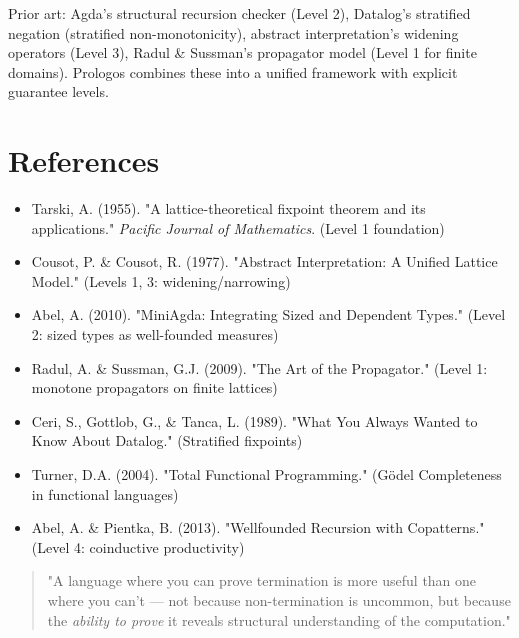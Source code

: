 \documentclass[11pt]{article}
\begin{document}
Prior art: Agda's structural recursion checker (Level 2), Datalog's
stratified negation (stratified non-monotonicity), abstract
interpretation's widening operators (Level 3), Radul \& Sussman's
propagator model (Level 1 for finite domains). Prologos combines
these into a unified framework with explicit guarantee levels.
\section{References}
\label{sec:org59c6d89}

\begin{itemize}
\item Tarski, A. (1955). "A lattice-theoretical fixpoint theorem and its
applications." \emph{Pacific Journal of Mathematics}. (Level 1 foundation)
\item Cousot, P. \& Cousot, R. (1977). "Abstract Interpretation: A Unified
Lattice Model." (Levels 1, 3: widening/narrowing)
\item Abel, A. (2010). "MiniAgda: Integrating Sized and Dependent Types."
(Level 2: sized types as well-founded measures)
\item Radul, A. \& Sussman, G.J. (2009). "The Art of the Propagator."
(Level 1: monotone propagators on finite lattices)
\item Ceri, S., Gottlob, G., \& Tanca, L. (1989). "What You Always Wanted
to Know About Datalog." (Stratified fixpoints)
\item Turner, D.A. (2004). "Total Functional Programming." (Gödel
Completeness in functional languages)
\item Abel, A. \& Pientka, B. (2013). "Wellfounded Recursion with
Copatterns." (Level 4: coinductive productivity)
\end{itemize}

\begin{quote}
"A language where you can prove termination is more useful than one
where you can't --- not because non-termination is uncommon, but
because the \emph{ability to prove} it reveals structural understanding of
the computation."
\end{quote}
\end{document}
